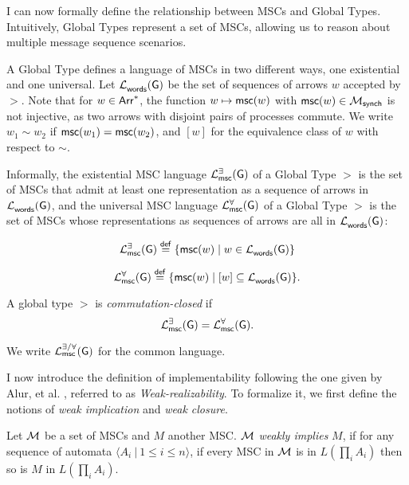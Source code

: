I can now formally define the relationship between MSCs and Global Types. 
Intuitively, Global Types represent a set of MSCs, allowing us to reason 
about multiple message sequence scenarios. 

A Global Type defines a language of MSCs in two different ways, one
existential and one universal. Let $\mathcal{L}_{\mathsf{words}}^{}(\mathsf{G})$ be the set of
sequences of arrows $w$ accepted by $\gt$. Note that for $w \in \mathsf{Arr}^*$,
the function $w \mapsto \mathsf{msc}(w)$ with
$\mathsf{msc}(w) \in \mathcal{M}_{\mathsf{synch}}$ is not injective, as two
arrows with disjoint pairs of processes commute. We write $w_1 \sim w_2$ if
$\mathsf{msc}(w_1) = \mathsf{msc}(w_2)$, and $[w]$ for the equivalence class
of $w$ with respect to $\sim$.

Informally, the existential MSC language $\mathcal{L}_{\mathsf{msc}}^{\exists}(\mathsf{G}){}$ of a 
Global Type $\gt$ is the set of MSCs that admit at least one representation as a
sequence of arrows in $\mathcal{L}_{\mathsf{words}}^{}(\mathsf{G})$, and the universal MSC
language $\universalmsclanguageof{\gt}$ of a Global Type $\gt$ is the set of
MSCs whose representations as sequences of arrows are all in
$\mathcal{L}_{\mathsf{words}}^{}(\mathsf{G})$:
\begin{definition}[$\existentialmsclanguageof{\gt}$]
	$$
		\mathcal{L}_{\mathsf{msc}}^{\exists}(\mathsf{G}) \stackrel{\mathsf{def}}{=} \{\mathsf{msc}(w) \mid
		w \in \mathcal{L}_{\mathsf{words}}^{}(\mathsf{G})\}
  $$
\end{definition}

\begin{definition}[$\universalmsclanguageof{\gt}$]
  $$
		\mathcal{L}_{\mathsf{msc}}^{\forall}(\mathsf{G}) \stackrel{\mathsf{def}}{=} \{\mathsf{msc}(w) \mid
		[w] \subseteq \mathcal{L}_{\mathsf{words}}^{}(\mathsf{G})\}.
	$$
\end{definition}

\begin{definition}
    A global type $\gt$ is \emph{commutation-closed} if
    $$
    \mathcal{L}_{\mathsf{msc}}^{\exists}(\mathsf{G}) = \mathcal{L}_{\mathsf{msc}}^{\forall}(\mathsf{G}).
    $$
\end{definition}
We write $\mathcal{L}_{\mathsf{msc}}^{\exists/\forall}(\mathsf{G})$ for the common language.

I now introduce the definition of implementability following the one given 
by Alur, et al. \cite{alur2005realizability}, referred to as 
\textit{Weak-realizability}.
To formalize it, we first define the notions of 
\textit{weak implication} and \textit{weak closure}.


\begin{definition}
	Let $\mathcal{M}$ be a set of MSCs and $M$ another MSC. $\mathcal{M}$
	\textit{weakly implies} $M$, if for any sequence of automata
	$\langle A_i \ |\ 1\leq i\leq n\rangle$, if every MSC in $\mathcal{M}$ is in
	$L(\prod_i A_i)$ then so is $M$ in $L(\prod_i A_i)$.
\end{definition}

